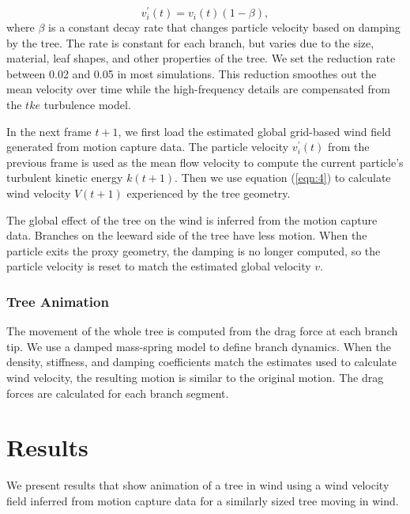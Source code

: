 \begin{equation}
\label{eqn:6}
		v_i^{'}(t) = v_i(t)(1-\beta),
\end{equation}
where $\beta$ is a constant decay rate that changes particle velocity based on damping by the tree. The rate is constant for each branch, but varies due to the size, material, leaf shapes, and other properties of the tree. We set the reduction rate between 0.02 and 0.05 in most simulations. This reduction smoothes out the mean velocity over time while the high-frequency details are compensated from the $tke$ turbulence model.

In the next frame $t+1$, we first load the estimated global grid-based wind field generated from motion capture data. The particle velocity $v_i^{'}(t)$ from the previous frame is used as the mean flow velocity to compute the current particle's turbulent kinetic energy $k(t+1)$. Then we use equation (\ref{eqn:4}) to calculate wind velocity $V(t+1)$ experienced by the tree geometry. 

The global effect of the tree on the wind is inferred from the motion capture data. Branches on the leeward side of the tree have less motion. When the particle exits the proxy geometry, the damping is no longer computed, so the particle velocity is reset to match the estimated global velocity $v$.

\subsubsection{Tree Animation}

The movement of the whole tree is computed from the drag force at each branch tip. We use a damped mass-spring model to define branch dynamics. When the density, stiffness, and damping coefficients match the estimates used to calculate wind velocity, the resulting motion is similar to the original motion. The drag forces are calculated for each branch segment.

\section{Results}
\label{sec:4results}

We present results that show animation of a tree in wind using a wind velocity field inferred from motion capture data for a similarly sized tree moving in wind.  


